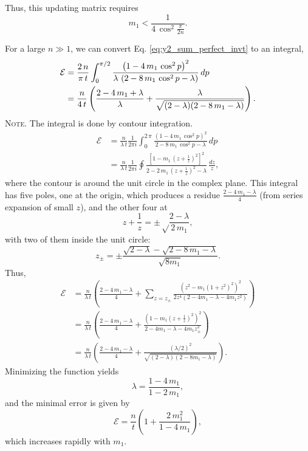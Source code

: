 \documentclass[reprint]{revtex4-1}
\newcommand{\note}[1]{{\color{DarkGreen}\footnotesize \textsc{Note.} #1}}
\begin{document}
Thus, this updating matrix requires
$$
m_1 < \frac{1}{4 \, \cos^2\frac{\pi}{2n} }.
$$



For a large $n \gg 1$,
we can convert Eq.
\eqref{eq:y2_sum_perfect_invt}
to an integral,
$$
\begin{aligned}
\mathcal E
&=
\frac{2 \, n}{\pi \, t}
\int_0^{\pi/2}
\frac{ \left(1 - 4 \, m_1 \, \cos^2 p \right)^2 }
{ \lambda \, \left(2 - 8 \, m_1 \, \cos^2 p - \lambda \right) }
\, dp
\notag \\
&=
\frac{n}{4 \, t}
\left(
  \frac{2 - 4 \, m_1 + \lambda}{ \lambda }
  +
  \frac{ \lambda }
  { \sqrt{ (2 - \lambda) (2 - 8 \, m_1 - \lambda) } }
\right).
\end{aligned}
$$
\note{
  The integral is done by contour integration.
$$
\begin{aligned}
\mathcal E
&=
\frac{n}{\lambda \, t}
\frac{1}{2 \pi i}
\int_0^{2 \, \pi}
\frac{ \left(1 - 4 \, m_1 \, \cos^2 p \right)^2 }
{ 2 - 8 \, m_1 \, \cos^2 p - \lambda }
\, dp
\\
&=
\frac{n}{\lambda \, t}
\frac{1}{2 \pi i}
\oint
\frac{ \left[1 - m_1 \, \left(z+\frac{1}{z}\right)^2 \right]^2 }
{ 2 - 2 \, m_1 \, \left(z + \frac{1}{z}\right)^2 - \lambda }
\, \frac{dz}{z},
\end{aligned}
$$
where the contour is around the unit circle in the complex plane.
%
This integral has five poles, one at the origin,
which produces a residue $\frac{2 - 4 \, m_1 - \lambda}{4}$
(from series expansion of small $z$),
and the other four at
$$
z + \frac{1}{z} = \pm\sqrt\frac{2-\lambda}{2 \, m_1},
$$
with two of them inside the unit circle:
$$
z_\pm = \pm \frac{\sqrt{2-\lambda} -\sqrt{2 - 8 \, m_1 - \lambda}}
{\sqrt{8 m_1}}.
$$
Thus,
$$
\begin{aligned}
  \mathcal E
&=
\frac{n}{\lambda \, t}
\left(
 \frac{2 - 4 \, m_1 - \lambda}{4}
 +
 \sum_{z = z_{\pm} }
 \frac{ \left(z^2 - m_1 (1 + z^2)^2 \right)^2 }
 { 2 z^4 (2 - 4 m_1 - \lambda - 4 m_1 z^2) }
\right)
\\
&=
\frac{n}{\lambda \, t}
\left(
  \frac{2 - 4 \, m_1 - \lambda}{4}
 +
 \frac{ \left(1 - m_1 \left(z + \frac{1}{z} \right)^2 \right)^2 }
 { 2 - 4 m_1 - \lambda - 4 m_1 z_{\pm}^2 }
\right)
\\
&=
\frac{n}{\lambda \, t}
\left(
  \frac{2 - 4 \, m_1 - \lambda}{4}
 +
 \frac{ (\lambda/2)^2 }
 { \sqrt{(2-\lambda) (2 - 8 m_1 -\lambda)} }
\right).
\end{aligned}
$$
}
%
Minimizing the function yields
%
\begin{equation}
\lambda = \frac{1 - 4 \, m_1} { 1 - 2 \, m_1 },
\label{eq:lambda_tridiag}
\end{equation}
%
and the minimal error is given by
%
\begin{equation}
\mathcal E
=
\frac{n}{t}
\left(
  1+ \frac{2 \, m_1^2}{1-4 \, m_1}
\right),
\label{eq:error_tridiag}
\end{equation}
%
which increases rapidly with $m_1$.
\end{document}
